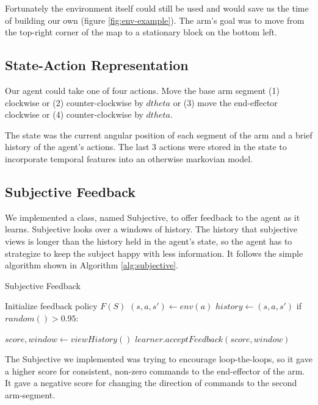 \documentclass{article}
\newlength\myindent
\newcommand\bindent{%
  \begingroup
  \setlength{\itemindent}{\myindent}
  \addtolength{\algorithmicindent}{\myindent}
}
\newcommand\eindent{\endgroup}
\begin{document}
Fortunately the environment itself could still be used and would save us the time of building our own (figure \ref{fig:env-example}). The arm's goal was to move from the top-right corner of the map to a stationary block on the bottom left. 

\subsection{State-Action Representation}

Our agent could take one of four actions. Move the base arm segment (1) clockwise or (2) counter-clockwise by $dtheta$ or (3) move the end-effector clockwise or (4) counter-clockwise by $dtheta$.

The state was the current angular position of each segment of the arm and a brief history of the agent's actions. The last 3 actions were stored in the state to incorporate temporal features into an otherwise markovian model.

\subsection{Subjective Feedback}

We implemented a class, named Subjective, to offer feedback to the agent as it learns. Subjective looks over a windows of history. The history that subjective views is longer than the history held in the agent's state, so the agent has to strategize to keep the subject happy with less information. It follows the simple algorithm shown in Algorithm \ref{alg:subjective}.

\begin{algorithm}
  \caption{Subjective Feedback} \label{alg:subjective}
  \begin{algorithmic}
    \STATE Initialize feedback policy $F(S)$
      \STATE $(s,a,s') \leftarrow env(a)$
      \STATE $history \leftarrow (s,a,s')$
      \STATE if $random() > 0.95$:
      \bindent
        \STATE $score,window \leftarrow viewHistory()$
        \STATE $learner.acceptFeedback(score, window)$
      \eindent
     \ENDWHILE
  \end{algorithmic}
\end{algorithm} 

The Subjective we implemented was trying to encourage loop-the-loops, so it gave a higher score for consistent, non-zero commands to the end-effector of the arm. It gave a negative score for changing the direction of commands to the second arm-segment.
\end{document}
